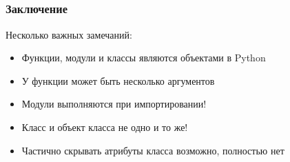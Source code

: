 \documentclass[fleqn, xcolor=x11names, 11pt]{beamer}
\begin{document}
\subsection*{}
\begin{frame}[fragile]\frametitle{Заключение}

Несколько важных замечаний:

\begin{itemize}
\item Функции, модули и классы являются объектами в Python

\item У функции может быть несколько аргументов

\item Модули выполняются при импортировании!

\item Класс и объект класса не одно и то же!

\item Частично скрывать атрибуты класса возможно, полностью нет

\end{itemize}
\end{frame}
\end{document}
